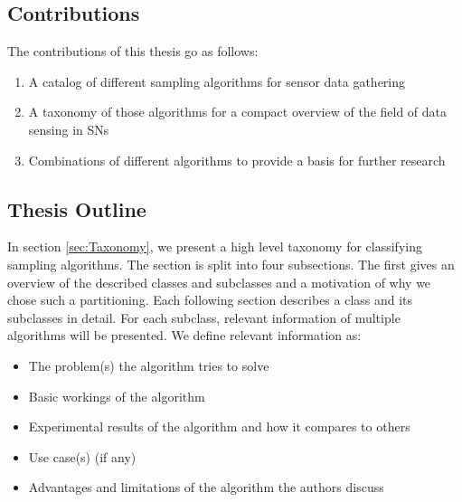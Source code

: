 

\FloatBarrier


\subsection{Contributions}
\label{sec:contributions}

The contributions of this thesis go as follows: 
\begin{enumerate}
	\item A catalog of different sampling algorithms for sensor data gathering
	\item A taxonomy of those algorithms for a compact overview of the field of data sensing in \acp{SN}
	\item Combinations of different algorithms to provide a basis for further
	research
\end{enumerate}


\subsection{Thesis Outline}

  In section \ref{sec:Taxonomy}, we present a
high level taxonomy for classifying sampling algorithms. The section is split
into four subsections. The first gives an overview of the described classes and
subclasses and a motivation of why we chose such a partitioning. Each following
section describes a class and its subclasses in detail. For each subclass,
relevant information of multiple algorithms will be presented. We define
relevant information as:
\begin{itemize}
	\item The problem(s) the algorithm tries to solve
	\item Basic workings of the algorithm
	\item Experimental results of the algorithm and how it compares to others
	\item Use case(s) (if any)
	\item Advantages and limitations of the algorithm the authors discuss
\end{itemize}

